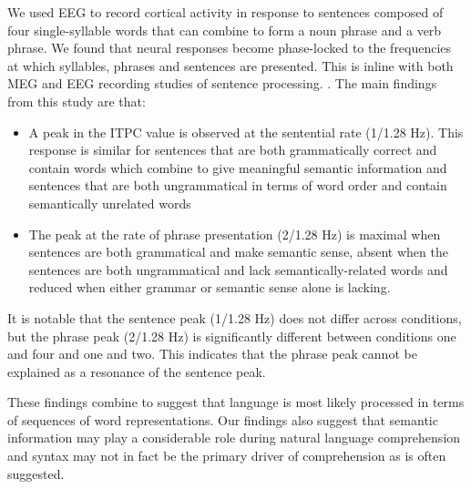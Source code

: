 \documentclass[10pt,letterpaper]{article}
\begin{document}
We used EEG to record cortical activity in response to sentences
composed of four single-syllable words that can combine to form a noun
phrase and a verb phrase. We found that neural responses become
phase-locked to the frequencies at which syllables, phrases and
sentences are presented. This is inline with both MEG and EEG
recording studies of sentence processing.
\cite{DingEtAl2015,DingEtAl2017}. The main findings from this study
are that:
\begin{itemize}
\item A peak in the ITPC value is observed at the sentential rate
  (1/1.28 Hz). This response is similar for sentences that are both
  grammatically correct and contain words which combine to give
  meaningful semantic information and sentences that are both
  ungrammatical in terms of word order and contain semantically
  unrelated words
\item The peak at the rate of phrase presentation
  (2/1.28 Hz) is maximal when sentences are both grammatical and make
  semantic sense, absent when the sentences are both ungrammatical and
  lack semantically-related words and reduced when either grammar or
  semantic sense alone is lacking. 
\end{itemize}
%
% 
%
It is notable that the sentence peak (1/1.28 Hz) does not differ
across conditions, but the phrase peak (2/1.28 Hz) is significantly
different between conditions one and four and one and two. This indicates that the
phrase peak cannot be explained as a resonance of the sentence peak.

%
% 
%
These findings combine to suggest that language is most likely
processed in terms of sequences of word representations. Our findings
also suggest that semantic information may play a considerable role
during natural language comprehension and syntax may not in fact be
the primary driver of comprehension as is often suggested.
\end{document}
